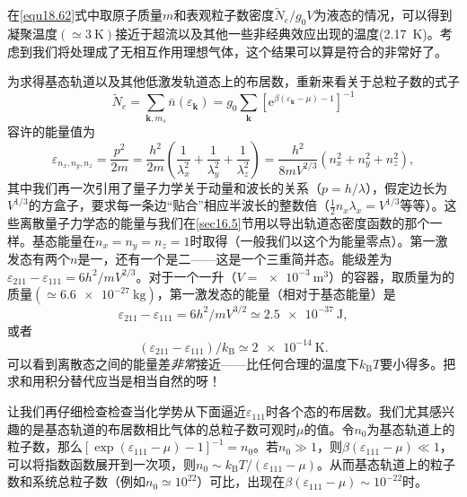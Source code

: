 在\eqref{equ18.62}式中取原子质量$m$和表观粒子数密度$\tilde N_e/g_0V$为液态的情况，可以得到凝聚温度$(\simeq\SI{3}{\kelvin})$接近于超流以及其他一些非经典效应出现的温度(\SI{2.17}{\kelvin})。考虑到我们将处理成了无相互作用理想气体，这个结果可以算是符合的非常好了。

为求得基态轨道以及其他低激发轨道态上的布居数，重新来看关于总粒子数的式子
\begin{equation}
\tilde N_e=\sum_{{\mathbf k},m_s}\bar n(\varepsilon_{\mathbf k})=g_0\sum_{\mathbf k}\left[\mathrm e^{\beta(\varepsilon_{\mathbf k}-\mu)-1}\right]^{-1}
\end{equation}
容许的能量值为
\begin{equation}
\varepsilon_{n_x,n_y,n_z}=\frac{p^2}{2m}=\frac{h^2}{2m}\left(\frac{1}{\lambda_x^2}+\frac{1}{\lambda_y^2}+\frac{1}{\lambda_z^2}\right)=\frac{h^2}{8mV^{2/3}}\left(n_x^2+n_y^2+n_z^2\right),
\end{equation}
其中我们再一次引用了量子力学关于动量和波长的关系（$p=h/\lambda$），假定边长为$V^{1/3}$的方盒子，要求每一条边``贴合''相应半波长的整数倍（$\frac{1}{2}n_x\lambda_x=V^{1/3}$等等）。这些离散量子力学态的能量与我们在\ref{sec16.5}节用以导出轨道态密度函数的那个一样。基态能量在$n_x=n_y=n_z=1$时取得（一般我们以这个为能量零点）。第一激发态有两个$n$是一，还有一个是二——这是一个三重简并态。能级差为$\varepsilon_{211}-\varepsilon_{111}=6h^2/mV^{2/3}$。对于一个一升（$V=\SI{e-3}{\cubic\meter}$）的容器，取质量为的质量$(\simeq\SI{6.6e-27}{\kilo\gram})$，第一激发态的能量（相对于基态能量）是
\begin{equation*}
\varepsilon_{211}-\varepsilon_{111}=6h^2/mV^{3/2}\simeq\SI{2.5e-37}{\joule},
\end{equation*}
或者
\begin{equation}
(\varepsilon_{211}-\varepsilon_{111})/k_\text{B}\simeq\SI{2e-14}{\kelvin}.
\label{equ18.65}
\end{equation}
可以看到离散态之间的能量差{\it 非常}接近——比任何合理的温度下$k_\text{B}T$要小得多。把求和用积分替代应当是相当自然的呀！

让我们再仔细检查检查当化学势从下面逼近$\varepsilon_{111}$时各个态的布居数。我们尤其感兴趣的是基态轨道的布居数相比气体的总粒子数可观时$\mu$的值。令$n_0$为基态轨道上的粒子数，那么$[\exp(\varepsilon_{111}-\mu)-1]^{-1}=n_0$。若$n_0\gg 1$，则$\beta(\varepsilon_{111}-\mu)\ll 1$，可以将指数函数展开到一次项，则$n_0\sim k_\text{B}T/(\varepsilon_{111}-\mu)$。从而基态轨道上的粒子数和系统总粒子数（例如$n_0\simeq 10^{22}$）可比，出现在$\beta(\varepsilon_{111}-\mu)\sim 10^{-22}$时。

